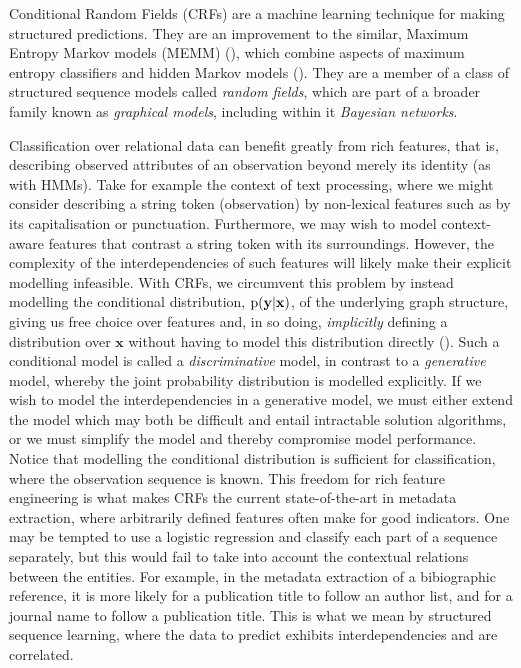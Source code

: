 Conditional Random Fields (CRFs) are a machine learning technique for making structured predictions. They are an improvement to the similar, Maximum Entropy Markov models (MEMM) (\cite{mccallum2000maximum}), which combine aspects of maximum entropy classifiers and hidden Markov models (\cite{lafferty2001conditional}). They are a member of a class of structured sequence models called \emph{random fields}, which are part of a broader family known as \emph{graphical models}, including within it \emph{Bayesian networks}.

Classification over relational data can benefit greatly from rich features, that is, describing observed attributes of an observation beyond merely its identity (as with HMMs). Take for example the context of text processing, where we might consider describing a string token (observation) by non-lexical features such as by its capitalisation or punctuation. Furthermore, we may wish to model context-aware features that contrast a string token with its surroundings. However, the complexity of the interdependencies of such features will likely make their explicit modelling infeasible. With CRFs, we circumvent this problem by instead modelling the conditional distribution, $\text{p}(\mathbf{y}|\mathbf{x})$, of the underlying graph structure, giving us free choice over features and, in so doing, \emph{implicitly} defining a distribution over $\mathbf{x}$ without having to model this distribution directly (\cite{sutton2006introduction}). Such a conditional model is called a \emph{discriminative} model, in contrast to a \emph{generative} model, whereby the joint probability distribution is modelled explicitly. If we wish to model the interdependencies in a generative model, we must either extend the model which may both be difficult and entail intractable solution algorithms, or we must simplify the model and thereby compromise model performance. Notice that modelling the conditional distribution is sufficient for classification, where the observation sequence is known. This freedom for rich feature engineering is what makes CRFs the current state-of-the-art in metadata extraction, where arbitrarily defined features often make for good indicators. One may be tempted to use a logistic regression and classify each part of a sequence separately, but this would fail to take into account the contextual relations between the entities. For example, in the metadata extraction of a bibiographic reference, it is more likely for a publication title to follow an author list, and for a journal name to follow a publication title. This is what we mean by structured sequence learning, where the data to predict exhibits interdependencies and are correlated.

